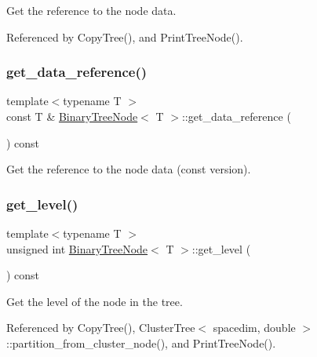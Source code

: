 Get the reference to the node data. 

Referenced by Copy\+Tree(), and Print\+Tree\+Node().

\mbox{\label{classBinaryTreeNode_a6bfbb8840c8a263ffcaacb0b7b61170c}} 
\subsubsection{\texorpdfstring{get\+\_\+data\+\_\+reference()}{get\_data\_reference()}\hspace{0.1cm}{\footnotesize\ttfamily [2/2]}}
{\footnotesize\ttfamily template$<$typename T $>$ \\
const T \& \hyperlink{classBinaryTreeNode}{Binary\+Tree\+Node}$<$ T $>$\+::get\+\_\+data\+\_\+reference (\begin{DoxyParamCaption}{ }\end{DoxyParamCaption}) const}

Get the reference to the node data (const version). \mbox{\label{classBinaryTreeNode_aa89de0a58ae53ae5eb701bec3adc880a}} 
\subsubsection{\texorpdfstring{get\+\_\+level()}{get\_level()}}
{\footnotesize\ttfamily template$<$typename T $>$ \\
unsigned int \hyperlink{classBinaryTreeNode}{Binary\+Tree\+Node}$<$ T $>$\+::get\+\_\+level (\begin{DoxyParamCaption}{ }\end{DoxyParamCaption}) const}

Get the level of the node in the tree. 

Referenced by Copy\+Tree(), Cluster\+Tree$<$ spacedim, double $>$\+::partition\+\_\+from\+\_\+cluster\+\_\+node(), and Print\+Tree\+Node().

\mbox{\label{classBinaryTreeNode_a0c22f12230f685c522ab80484ce4ce7f}} 
